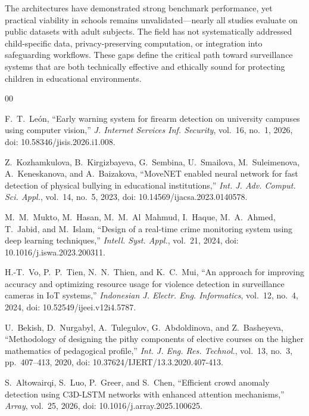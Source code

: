 \documentclass[conference]{IEEEtran}
\begin{document}
The architectures have demonstrated strong benchmark performance, yet practical viability in schools remains unvalidated---nearly all studies evaluate on public datasets with adult subjects. The field has not systematically addressed child-specific data, privacy-preserving computation, or integration into safeguarding workflows. These gaps define the critical path toward surveillance systems that are both technically effective and ethically sound for protecting children in educational environments.

\begin{thebibliography}{00}
\renewcommand{\bibfont}{\scriptsize}
\setlength{\bibsep}{0pt}
\setlength{\bibitemsep}{0pt}

 F.~T.~Le\'{o}n, ``Early warning system for firearm detection on university campuses using computer vision,'' \textit{J. Internet Services Inf. Security}, vol.~16, no.~1, 2026, doi: 10.58346/jisis.2026.i1.008.

 Z.~Kozhamkulova, B.~Kirgizbayeva, G.~Sembina, U.~Smailova, M.~Suleimenova, A.~Keneskanova, and A.~Baizakova, ``MoveNET enabled neural network for fast detection of physical bullying in educational institutions,'' \textit{Int. J. Adv. Comput. Sci. Appl.}, vol.~14, no.~5, 2023, doi: 10.14569/ijacsa.2023.0140578.

 M.~M.~Mukto, M.~Hasan, M.~M.~Al~Mahmud, I.~Haque, M.~A.~Ahmed, T.~Jabid, and M.~Islam, ``Design of a real-time crime monitoring system using deep learning techniques,'' \textit{Intell. Syst. Appl.}, vol.~21, 2024, doi: 10.1016/j.iswa.2023.200311.

 H.-T.~Vo, P.~P.~Tien, N.~N.~Thien, and K.~C.~Mui, ``An approach for improving accuracy and optimizing resource usage for violence detection in surveillance cameras in IoT systems,'' \textit{Indonesian J. Electr. Eng. Informatics}, vol.~12, no.~4, 2024, doi: 10.52549/ijeei.v12i4.5787.

 U.~Bekish, D.~Nurgabyl, A.~Tulegulov, G.~Abdoldinova, and Z.~Basheyeva, ``Methodology of designing the pithy components of elective courses on the higher mathematics of pedagogical profile,'' \textit{Int. J. Eng. Res. Technol.}, vol.~13, no.~3, pp.~407--413, 2020, doi: 10.37624/IJERT/13.3.2020.407-413.

 S.~Altowairqi, S.~Luo, P.~Greer, and S.~Chen, ``Efficient crowd anomaly detection using C3D-LSTM networks with enhanced attention mechanisms,'' \textit{Array}, vol.~25, 2026, doi: 10.1016/j.array.2025.100625.


\end{thebibliography}
\end{document}
